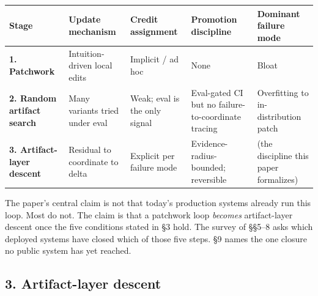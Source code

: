 \documentclass[
]{article}
\newcounter{none} %
\begin{document}
{\def\LTcaptype{none} %
\begin{longtable}[]{@{}
  >{\raggedright\arraybackslash}p{}
  >{\raggedright\arraybackslash}p{}
  >{\raggedright\arraybackslash}p{}
  >{\raggedright\arraybackslash}p{}
  >{\raggedright\arraybackslash}p{}@{}}
\toprule\noalign{}
\begin{minipage}[b]{\linewidth}\raggedright
Stage
\end{minipage} & \begin{minipage}[b]{\linewidth}\raggedright
Update mechanism
\end{minipage} & \begin{minipage}[b]{\linewidth}\raggedright
Credit assignment
\end{minipage} & \begin{minipage}[b]{\linewidth}\raggedright
Promotion discipline
\end{minipage} & \begin{minipage}[b]{\linewidth}\raggedright
Dominant failure mode
\end{minipage} \\
\midrule\noalign{}
\endhead
\bottomrule\noalign{}
\endlastfoot
\textbf{1. Patchwork} & Intuition-driven local edits & Implicit / ad hoc
& None & Bloat \\
\textbf{2. Random artifact search} & Many variants tried under eval &
Weak; eval is the only signal & Eval-gated CI but no
failure-to-coordinate tracing & Overfitting to in-distribution patch \\
\textbf{3. Artifact-layer descent} & Residual to coordinate to delta &
Explicit per failure mode & Evidence-radius-bounded; reversible & (the
discipline this paper formalizes) \\
\end{longtable}
}

The paper's central claim is not that today's production systems already
run this loop. Most do not. The claim is that a patchwork loop
\emph{becomes} artifact-layer descent once the five conditions stated in
§3 hold. The survey of §§5--8 asks which deployed systems have closed
which of those five steps. §9 names the one closure no public system has
yet reached.

\subsection{3. Artifact-layer descent}\label{artifact-layer-descent}
\end{document}
